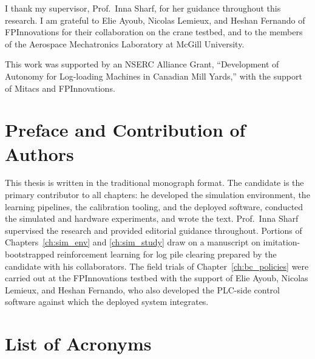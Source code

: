 \documentclass[12pt, letterpaper]{report}
\begin{document}
I thank my supervisor, Prof.\ Inna Sharf, for her guidance throughout this
research. I am grateful to Elie Ayoub, Nicolas Lemieux, and Heshan Fernando
of FPInnovations for their collaboration on the crane testbed, and to the
members of the Aerospace Mechatronics Laboratory at McGill University.

This work was supported by an NSERC Alliance Grant, ``Development of
Autonomy for Log-loading Machines in Canadian Mill Yards,'' with the support
of Mitacs and FPInnovations.

\chapter*{Preface and Contribution of Authors}
\label{chap:preface}

This thesis is written in the traditional monograph format. The candidate is
the primary contributor to all chapters: he developed the simulation
environment, the learning pipelines, the calibration tooling, and the
deployed software, conducted the simulated and hardware experiments, and
wrote the text. Prof.\ Inna Sharf supervised the research and provided
editorial guidance throughout. Portions of Chapters~\ref{ch:sim_env} and
\ref{ch:sim_study} draw on a manuscript on imitation-bootstrapped
reinforcement learning for log pile clearing prepared by the candidate with
his collaborators. The field trials of Chapter~\ref{ch:bc_policies} were
carried out at the FPInnovations testbed with the support of Elie Ayoub,
Nicolas Lemieux, and Heshan Fernando, who also developed the PLC-side
control software against which the deployed system integrates.

\tableofcontents\thispagestyle{plain}

\listoffigures\thispagestyle{plain}
\listoftables
\listofalgorithms\thispagestyle{plain}

\chapter*{List of Acronyms}
\end{document}
